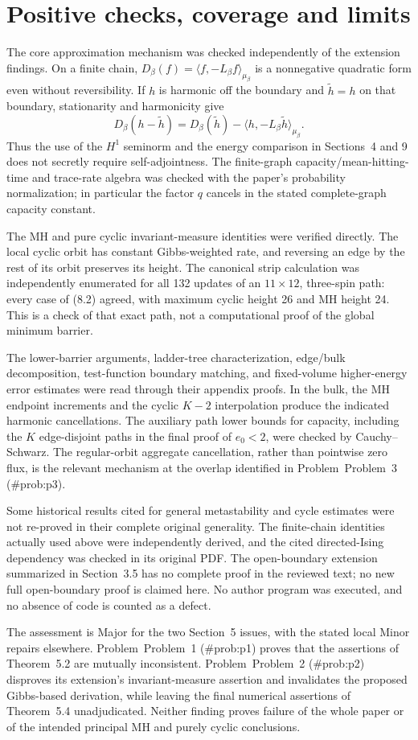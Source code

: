 \documentclass[10pt]{article}
\begin{document}
\section*{Positive checks, coverage and limits}
The core approximation mechanism was checked independently of the extension findings. On a finite chain, \(D_\beta(f)=\langle f,-L_\beta f\rangle_{\mu_\beta}\) is a nonnegative quadratic form even without reversibility. If \(h\) is harmonic off the boundary and \(\widetilde h=h\) on that boundary, stationarity and harmonicity give \[D_\beta(h-\widetilde h)
       =D_\beta(\widetilde h)-\langle h,-L_\beta\widetilde h\rangle_{\mu_\beta}.\] Thus the use of the \(H^1\) seminorm and the energy comparison in Sections 4 and 9 does not secretly require self-adjointness. The finite-graph capacity/mean-hitting-time and trace-rate algebra was checked with the paper’s probability normalization; in particular the factor \(q\) cancels in the stated complete-graph capacity constant.\par
The MH and pure cyclic invariant-measure identities were verified directly. The local cyclic orbit has constant Gibbs-weighted rate, and reversing an edge by the rest of its orbit preserves its height. The canonical strip calculation was independently enumerated for all 132 updates of an \(11\times12\), three-spin path: every case of (8.2) agreed, with maximum cyclic height 26 and MH height 24. This is a check of that exact path, not a computational proof of the global minimum barrier.\par
The lower-barrier arguments, ladder-tree characterization, edge/bulk decomposition, test-function boundary matching, and fixed-volume higher-energy error estimates were read through their appendix proofs. In the bulk, the MH endpoint increments and the cyclic \(K-2\) interpolation produce the indicated harmonic cancellations. The auxiliary path lower bounds for capacity, including the \(K\) edge-disjoint paths in the final proof of \(e_0<2\), were checked by Cauchy–Schwarz. The regular-orbit aggregate cancellation, rather than pointwise zero flux, is the relevant mechanism at the overlap identified in Problem Problem 3 (\#prob:p3).\par
Some historical results cited for general metastability and cycle estimates were not re-proved in their complete original generality. The finite-chain identities actually used above were independently derived, and the cited directed-Ising dependency was checked in its original PDF. The open-boundary extension summarized in Section 3.5 has no complete proof in the reviewed text; no new full open-boundary proof is claimed here. No author program was executed, and no absence of code is counted as a defect.\par
The assessment is Major for the two Section 5 issues, with the stated local Minor repairs elsewhere. Problem Problem 1 (\#prob:p1) proves that the assertions of Theorem 5.2 are mutually inconsistent. Problem Problem 2 (\#prob:p2) disproves its extension’s invariant-measure assertion and invalidates the proposed Gibbs-based derivation, while leaving the final numerical assertions of Theorem 5.4 unadjudicated. Neither finding proves failure of the whole paper or of the intended principal MH and purely cyclic conclusions.\par
\end{document}
